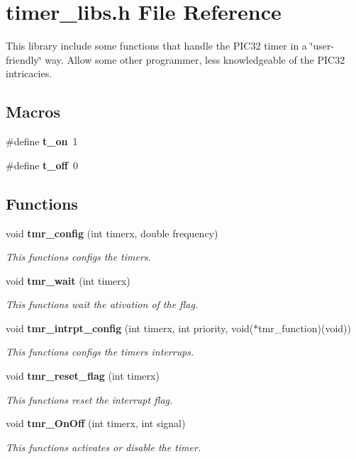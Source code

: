 \section{timer\+\_\+libs.\+h File Reference}
\label{timer__libs_8h}


This library include some functions that handle the P\+I\+C32 timer in a \char`\"{}user-\/friendly\char`\"{} way. Allow some other programmer, less knowledgeable of the P\+I\+C32 intricacies.  


\subsection*{Macros}
\begin{DoxyCompactItemize}
\item 
\#define \textbf{ t\+\_\+on}~1
\item 
\#define \textbf{ t\+\_\+off}~0
\end{DoxyCompactItemize}
\subsection*{Functions}
\begin{DoxyCompactItemize}
\item 
void \textbf{ tmr\+\_\+config} (int timerx, double frequency)
\begin{DoxyCompactList}\small\item\em This functions configs the timer\textquotesingle{}s. \end{DoxyCompactList}\item 
void \textbf{ tmr\+\_\+wait} (int timerx)
\begin{DoxyCompactList}\small\item\em This functions wait the ativation of the flag. \end{DoxyCompactList}\item 
void \textbf{ tmr\+\_\+intrpt\+\_\+config} (int timerx, int priority, void($\ast$tmr\+\_\+function)(void))
\begin{DoxyCompactList}\small\item\em This functions configs the timer\textquotesingle{}s interrups. \end{DoxyCompactList}\item 
void \textbf{ tmr\+\_\+reset\+\_\+flag} (int timerx)
\begin{DoxyCompactList}\small\item\em This functions reset the interrupt flag. \end{DoxyCompactList}\item 
void \textbf{ tmr\+\_\+\+On\+Off} (int timerx, int signal)
\begin{DoxyCompactList}\small\item\em This functions activates or disable the timer. \end{DoxyCompactList}\end{DoxyCompactItemize}



